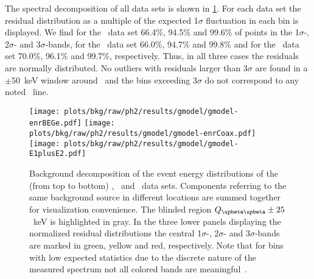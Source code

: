 The spectral decomposition of all data sets is shown in
\cref{fig:bkg:raw:ph2:gmodel:results}. For each data set the residual distribution as a
multiple of the expected 1$\sigma$ fluctuation in each bin is displayed. We find for the
\enrBEGeII\ data set 66.4\%, 94.5\% and 99.6\% of points in the 1$\sigma$-, 2$\sigma$- and
3$\sigma$-bands, for the \enrCoaxII\ data set 66.0\%, 94.7\% and 99.8\% and for the
\enrGeII\ data set 70.0\%, 96.1\% and 99.7\%, respectively. Thus, in all three cases the
residuals are normally distributed. No outliers with residuals larger than $3\sigma$ are
found in a $\pm50$~keV window around \qbb\ and the bins exceeding $3\sigma$ do not
correspond to any noted \g\ line.

\begin{sidewaystable}
  \centering
  \footnotesize
  \caption{%
    Summary of the analysis parameter estimates. Global mode and marginalized mode, along
    with its smallest 68\% C.I., are reported as representatives of the posterior
    parameter distribution. The number of reconstructed counts in the fit range and the BI
    at \qbb\ prior active background suppression are listed for each component and each
    analysis data set. The original type of prior distribution is marked with \m{[f]} for
    flat, \m{[g]} for Gaussian and \m{[e]} for exponential. ($\,^{\dagger}$
    Tetratex\reg-coated) %
  }\label{tab:bkg:raw:ph2:gmodel:results}
\end{sidewaystable}

\begin{figure}
  \centering
  \texttt{[image: plots/bkg/raw/ph2/results/gmodel/gmodel-enrBEGe.pdf]}
  \texttt{[image: plots/bkg/raw/ph2/results/gmodel/gmodel-enrCoax.pdf]}
  \texttt{[image: plots/bkg/raw/ph2/results/gmodel/gmodel-E1plusE2.pdf]}
  \caption{%
    Background decomposition of the event energy distributions of the (from top to bottom)
    \enrBEGeII, \enrCoaxII\ and \enrGeII\ data sets.  Components referring to the same
    background source in different locations are summed together for visualization
    convenience. The blinded region $\qbbM \pm 25$~keV is highlighted in gray. In the
    three lower panels displaying the normalized residual distributions the central
    1$\sigma$-, 2$\sigma$- and 3$\sigma$-bands are marked in green, yellow and red,
    respectively. Note that for bins with low expected statistics due to the discrete
    nature of the measured spectrum not all colored bands are
    meaningful~\cite{Aggarwal2011}.%
  }\label{fig:bkg:raw:ph2:gmodel:results}
\end{figure}

